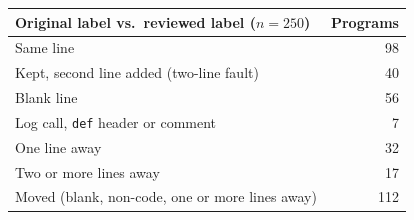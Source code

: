 \begin{tabular}{lr}
\toprule
Original label vs.\ reviewed label ($n=250$) & Programs \\
\midrule
Same line & 98 \\
Kept, second line added (two-line fault) & 40 \\
Blank line & 56 \\
Log call, \texttt{def} header or comment & 7 \\
One line away & 32 \\
Two or more lines away & 17 \\
\midrule
Moved (blank, non-code, one or more lines away) & 112 \\
\bottomrule
\end{tabular}
